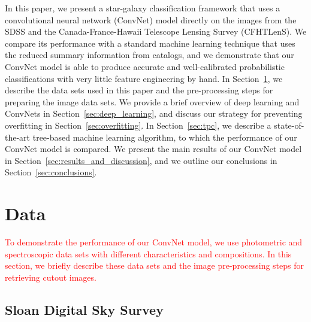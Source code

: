 \documentclass[fleqn,usenatbib]{mnras}
\newcommand{\changed}[1]{\textcolor{red}{#1}}
\begin{document}
In this paper, we present a star-galaxy classification framework
that uses a convolutional neural network (ConvNet) model directly on the images
from the SDSS and the Canada-France-Hawaii Telescope Lensing Survey (CFHTLenS).
We compare its performance with a standard machine learning technique
that uses the reduced summary information from catalogs,
and we demonstrate that our ConvNet model is able to produce accurate and
well-calibrated probabilistic classifications with very little feature
engineering by hand.
In Section~\ref{sec:data}, we describe the data sets used in this paper
and the pre-processing steps for preparing the image data sets.
We provide a brief overview of deep learning and ConvNets
in Section~\ref{sec:deep_learning}, and
discuss our strategy for preventing overfitting in Section~\ref{sec:overfitting}.
In Section~\ref{sec:tpc}, we describe a state-of-the-art tree-based
machine learning algorithm, to which the performance of our ConvNet model is
compared.
We present the main results of our ConvNet model in
Section~\ref{sec:results_and_discussion}, and
we outline our conclusions in Section~\ref{sec:conclusions}.

\section{Data}
  \label{sec:data}

\changed{
To demonstrate the performance of our ConvNet model, we use photometric and
spectroscopic data sets with different characteristics and compositions.
In this section, we briefly describe these data sets and the image pre-processing
steps for retrieving cutout images.
}

\subsection{Sloan Digital Sky Survey}
  \label{sec:sdss}

\end{document}
